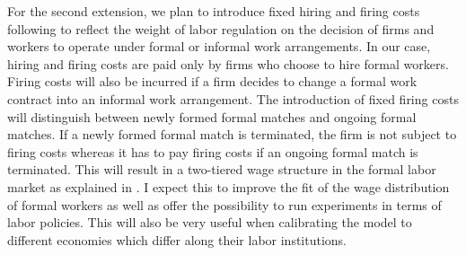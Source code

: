 \documentclass[12pt,a4paper,titlepage]{article}
\begin{document}
For the second extension, we plan to introduce fixed hiring and firing costs following \cite{Mortensen1999} to reflect the weight of labor regulation on the decision of firms and workers to operate under formal or informal work arrangements. In our case, hiring and firing costs are paid only by firms who choose to hire formal workers. Firing costs will also be incurred if a firm decides to change a formal work contract into an informal work arrangement. The introduction of fixed firing costs will distinguish between newly formed formal matches and ongoing formal matches. If a newly formed formal match is terminated, the firm is not subject to firing costs whereas it has to pay firing costs if an ongoing formal match is terminated. This will result in a two-tiered wage structure in the formal labor market as explained in \cite{Mortensen1999}. I expect this to improve the fit of the wage distribution of formal workers as well as offer the possibility to run experiments in terms of labor policies. This will also be very useful when calibrating the model to different economies which differ along their labor institutions.
\end{document}

